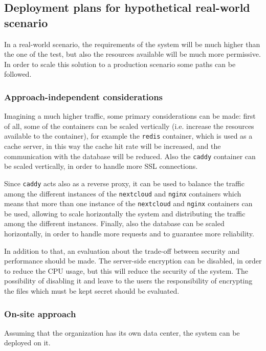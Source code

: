 \subsection{Deployment plans for hypothetical real-world scenario}
\label{subsec:deployment-real-world}

In a real-world scenario, the requirements of the system will be much higher than the one of the test, but also the resources available will be much more permissive.
In order to scale this solution to a production scenario some paths can be followed. 

\subsubsection{Approach-independent considerations}
\label{subsubsec:approach-independent}

Imagining a much higher traffic, some primary considerations can be made: 
first of all, some of the containers can be scaled vertically (i.e. increase the resources available to the container), for example the \texttt{redis} container, which is used as a cache server, in this way the cache hit rate will be increased, and the communication with the database will be reduced.
Also the \texttt{caddy} container can be scaled vertically, in order to handle more SSL connections.

Since \texttt{caddy} acts also as a reverse proxy, it can be used to balance the traffic among the different instances of the \texttt{nextcloud} and \texttt{nginx} containers which means that more than one instance of the \texttt{nextcloud} and \texttt{nginx} containers can be used, allowing to scale horizontally the system and distributing the traffic among the different instances.
Finally, also the database can be scaled horizontally, in order to handle more requests and to guarantee more reliability.

In addition to that, an evaluation about the trade-off between security and performance should be made. The server-side encryption can be disabled, in order to reduce the CPU usage, but this will reduce the security of the system. The possibility of disabling it and leave to the users the responsibility of encrypting the files which must be kept secret should be evaluated.

\subsubsection{On-site approach}
\label{subsubsec:cloudless}
Assuming that the organization has its own data center, the system can be deployed on it. 

